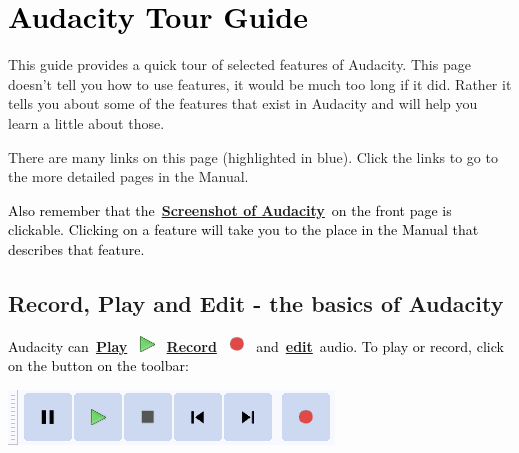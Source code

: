 \documentclass[letterpaper]{article}
\title{}
\begin{document}
\section[Audacity Tour Guide]{\textmd{\textcolor{black}{Audacity Tour Guide}}}
{\color{black}
This guide provides a quick tour of selected features of Audacity. This page doesn't tell you how to use features, it
would be much too long if it did. Rather it tells you about some of the features that exist in Audacity and will help
you learn a little about those.}

{\color{black}
There are many links on this page (highlighted in blue). Click the links to go to the more detailed pages in the
Manual.}

\textcolor{black}{Also remember that
the~}\href{https://manual.audacityteam.org/index.html#reference}{\textbf{\textcolor[rgb]{0.3529412,0.21176471,0.5882353}{Screenshot
of Audacity}}}\textcolor{black}{~on the front page is clickable. Clicking on a feature will take you to the place in
the Manual that describes that feature.}

\subsection[Record, Play and Edit {}- the basics of Audacity]{\color{black} Record, Play and Edit - the basics of
Audacity}
\textcolor{black}{Audacity
can~}\href{https://manual.audacityteam.org/man/playback.html}{\textbf{\textcolor[rgb]{0.3529412,0.21176471,0.5882353}{Play}}}\textcolor{black}{~}
\includegraphics[width=0.423cm,height=0.423cm]{TourGuide-img001.png}
\textcolor{black}{~}\href{https://manual.audacityteam.org/man/recording.html}{\textbf{\textcolor[rgb]{0.3529412,0.21176471,0.5882353}{Record}}}\textcolor{black}{~}
\includegraphics[width=0.423cm,height=0.423cm]{TourGuide-img002.png}
\textcolor{black}{~and~}\href{https://manual.audacityteam.org/man/edit.html}{\textbf{\textcolor[rgb]{0.3529412,0.21176471,0.5882353}{edit}}}\textcolor{black}{~audio.
To play or record, click on the button on the toolbar:}

 \includegraphics[width=8.652cm,height=1.455cm]{TourGuide-img003.png} 
\end{document}
